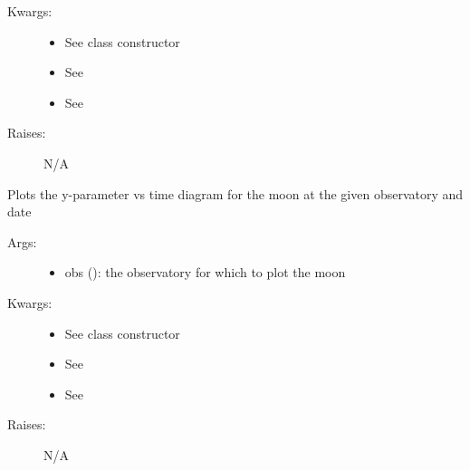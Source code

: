 \documentclass[letterpaper,10pt,english]{sphinxmanual}
\begin{document}
\begin{fulllineitems}
\begin{fulllineitems}
\begin{description}
\begin{itemize}
\end{itemize}

\item[{Kwargs:}] \leavevmode\begin{itemize}
\item {} 
See class constructor

\item {} 
See 

\item {} 
See 

\end{itemize}

\item[{Raises:}] \leavevmode
N/A

\end{description}

\end{fulllineitems}


\begin{fulllineitems}
\label{astroobs:astroobs.Moon.Moon.polar}
Plots the y-parameter vs time diagram for the moon at the given observatory and date
\begin{description}
\item[{Args:}] \leavevmode\begin{itemize}
\item {} 
obs (): the observatory for which to plot the moon

\end{itemize}

\item[{Kwargs:}] \leavevmode\begin{itemize}
\item {} 
See class constructor

\item {} 
See 

\item {} 
See 

\end{itemize}

\item[{Raises:}] \leavevmode
N/A

\end{description}

\end{fulllineitems}


\end{fulllineitems}
\end{document}
